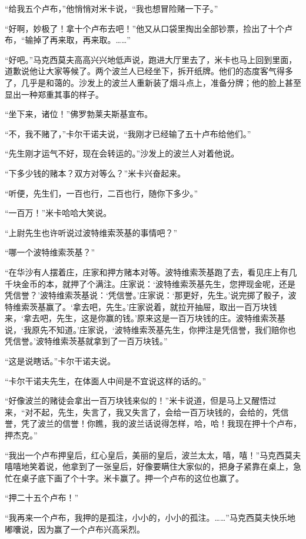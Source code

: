 \par “给我五个卢布，”他悄悄对米卡说，“我也想冒险赌一下子。”
\par “好啊，妙极了！拿十个卢布去吧！”他又从口袋里掏出全部钞票，捡出了十个卢布，“输掉了再来取，再来取。……”
\par “好吧。”马克西莫夫高高兴兴地低声说，跑进大厅里去了，米卡也马上回到里面，道歉说他让大家等候了。两个波兰人已经坐下，拆开纸牌。他们的态度客气得多了，几乎是和蔼的。沙发上的波兰人重新装了烟斗点上，准备分牌；他的脸上甚至显出一种郑重其事的样子。
\par “坐下来，诸位！”佛罗勃莱夫斯基宣布。
\par “不，我不赌了，”卡尔干诺夫说，“我刚才已经输了五十卢布给他们。”
\par “先生刚才运气不好，现在会转运的。”沙发上的波兰人对着他说。
\par “下多少钱的赌本？双方对等么？”米卡兴奋起来。
\par “听便，先生们，一百也行，二百也行，随你下多少。”
\par “一百万！”米卡哈哈大笑说。
\par “上尉先生也许听说过波特维索茨基的事情吧？”
\par “哪一个波特维索茨基？”
\par “在华沙有人摆着庄，庄家和押方赌本对等。波特维索茨基跑了去，看见庄上有几千块金币的本，就押了个满注。庄家说：‘波特维索茨基先生，您押现金呢，还是凭信誉？’波特维索茨基说：‘凭信誉。’庄家说：‘那更好，先生。’说完掷了骰子，波特维索茨基赢了。‘拿去吧，先生。’庄家说着，就拉开抽屉，取出一百万块钱来，‘拿去吧，先生，这是你赢的钱。’原来这是一百万块钱的庄。波特维索茨基说，‘我原先不知道。’庄家说，‘波特维索茨基先生，你押注是凭信誉，我们赔你也凭信誉。’波特维索茨基就拿到了一百万块钱。”
\par “这是说瞎话。”卡尔干诺夫说。
\par “卡尔干诺夫先生，在体面人中间是不宜说这样的话的。”
\par “好像波兰的赌徒会拿出一百万块钱来似的！”米卡说道，但是马上又醒悟过来，“对不起，先生，失言了，我又失言了，会给一百万块钱的，会给的，凭信誉，凭了波兰的信誉！你瞧，我的波兰话说得怎样，哈，哈！我现在押十个卢布，押杰克。”
\par “我出一个卢布押皇后，红心皇后，美丽的皇后，波兰太太，嘻，嘻！”马克西莫夫嘻嘻地笑着说，他拿到了一张皇后，好像要瞒住大家似的，把身子紧靠在桌上，急忙在桌子底下画了个十字。米卡赢了。押一个卢布的这位也赢了。
\par “押二十五个卢布！”
\par “我再来一个卢布，我押的是孤注，小小的，小小的孤注。……”马克西莫夫快乐地嘟囔说，因为赢了一个卢布兴高采烈。
